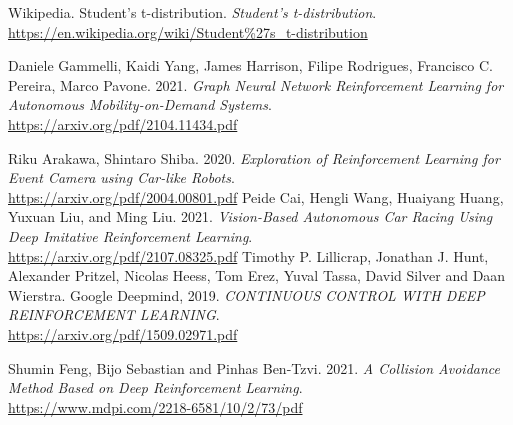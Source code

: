 \documentclass[14pt]{extarticle}
\begin{document}
\begin{thebibliography}{999}
  	Wikipedia. Student's t-distribution.
  \emph{Student's t-distribution}.\\
  \url{https://en.wikipedia.org/wiki/Student%27s_t-distribution}
  
  	Daniele Gammelli, Kaidi Yang, James Harrison, Filipe Rodrigues, Francisco C. Pereira, Marco Pavone. 2021.
  \emph{Graph Neural Network Reinforcement Learning for Autonomous Mobility-on-Demand Systems}.\\
  \url{https://arxiv.org/pdf/2104.11434.pdf}
  
  	Riku Arakawa, Shintaro Shiba. 2020.
  \emph{Exploration of Reinforcement Learning for Event Camera using
Car-like Robots}.\\
  \url{https://arxiv.org/pdf/2004.00801.pdf}
  	Peide Cai, Hengli Wang, Huaiyang Huang, Yuxuan Liu, and Ming Liu. 2021.
  \emph{Vision-Based Autonomous Car Racing Using Deep
Imitative Reinforcement Learning}.\\
  \url{https://arxiv.org/pdf/2107.08325.pdf}
  Timothy P. Lillicrap, Jonathan J. Hunt, Alexander Pritzel, Nicolas Heess,
Tom Erez, Yuval Tassa, David Silver and Daan Wierstra. Google Deepmind, 2019.
  \emph{CONTINUOUS CONTROL WITH DEEP REINFORCEMENT
LEARNING}.\\
  \url{https://arxiv.org/pdf/1509.02971.pdf}
  
  
  	Shumin Feng, Bijo Sebastian and Pinhas Ben-Tzvi. 2021.
  \emph{A Collision Avoidance Method Based on Deep
Reinforcement Learning}.\\
  \url{https://www.mdpi.com/2218-6581/10/2/73/pdf}

\end{thebibliography}
\end{document}

